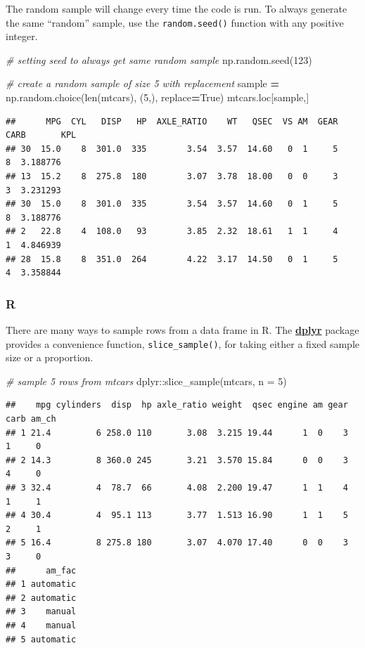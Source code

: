 \documentclass[
]{book}
\newenvironment{Shaded}{\begin{snugshade}}{\end{snugshade}}
\newcommand{\AttributeTok}[1]{\textcolor[rgb]{0.77,0.63,0.00}{#1}}
\newcommand{\BuiltInTok}[1]{#1}
\newcommand{\CommentTok}[1]{\textcolor[rgb]{0.56,0.35,0.01}{\textit{#1}}}
\newcommand{\DecValTok}[1]{\textcolor[rgb]{0.00,0.00,0.81}{#1}}
\newcommand{\FunctionTok}[1]{\textcolor[rgb]{0.00,0.00,0.00}{#1}}
\newcommand{\NormalTok}[1]{#1}
\newcommand{\OperatorTok}[1]{\textcolor[rgb]{0.81,0.36,0.00}{\textbf{#1}}}
\newcommand{\SpecialCharTok}[1]{\textcolor[rgb]{0.00,0.00,0.00}{#1}}
\newcommand{\VariableTok}[1]{\textcolor[rgb]{0.00,0.00,0.00}{#1}}
\begin{document}
The random sample will change every time the code is run. To always generate the same ``random'' sample, use the \texttt{random.seed()} function with any positive integer.

\begin{Shaded}
\begin{Highlighting}[]
\CommentTok{\# setting seed to always get same random sample}
\NormalTok{np.random.seed(}\DecValTok{123}\NormalTok{)}

\CommentTok{\# create a random sample of size 5 with replacement}
\NormalTok{sample }\OperatorTok{=}\NormalTok{ np.random.choice(}\BuiltInTok{len}\NormalTok{(mtcars), (}\DecValTok{5}\NormalTok{,), replace}\OperatorTok{=}\VariableTok{True}\NormalTok{)}
\NormalTok{mtcars.loc[sample,]}
\end{Highlighting}
\end{Shaded}

\begin{verbatim}
##      MPG  CYL   DISP   HP  AXLE_RATIO    WT   QSEC  VS AM  GEAR  CARB       KPL
## 30  15.0    8  301.0  335        3.54  3.57  14.60   0  1     5     8  3.188776
## 13  15.2    8  275.8  180        3.07  3.78  18.00   0  0     3     3  3.231293
## 30  15.0    8  301.0  335        3.54  3.57  14.60   0  1     5     8  3.188776
## 2   22.8    4  108.0   93        3.85  2.32  18.61   1  1     4     1  4.846939
## 28  15.8    8  351.0  264        4.22  3.17  14.50   0  1     5     4  3.358844
\end{verbatim}

\hypertarget{r-29}{%
\subsubsection*{R}\label{r-29}}

There are many ways to sample rows from a data frame in R. The \href{https://dplyr.tidyverse.org/}{\textbf{dplyr}} package provides a convenience function, \texttt{slice\_sample()}, for taking either a fixed sample size or a proportion.

\begin{Shaded}
\begin{Highlighting}[]
\CommentTok{\# sample 5 rows from mtcars}
\NormalTok{dplyr}\SpecialCharTok{::}\FunctionTok{slice\_sample}\NormalTok{(mtcars, }\AttributeTok{n =} \DecValTok{5}\NormalTok{)}
\end{Highlighting}
\end{Shaded}

\begin{verbatim}
##    mpg cylinders  disp  hp axle_ratio weight  qsec engine am gear carb am_ch
## 1 21.4         6 258.0 110       3.08  3.215 19.44      1  0    3    1     0
## 2 14.3         8 360.0 245       3.21  3.570 15.84      0  0    3    4     0
## 3 32.4         4  78.7  66       4.08  2.200 19.47      1  1    4    1     1
## 4 30.4         4  95.1 113       3.77  1.513 16.90      1  1    5    2     1
## 5 16.4         8 275.8 180       3.07  4.070 17.40      0  0    3    3     0
##      am_fac
## 1 automatic
## 2 automatic
## 3    manual
## 4    manual
## 5 automatic
\end{verbatim}
\end{document}
